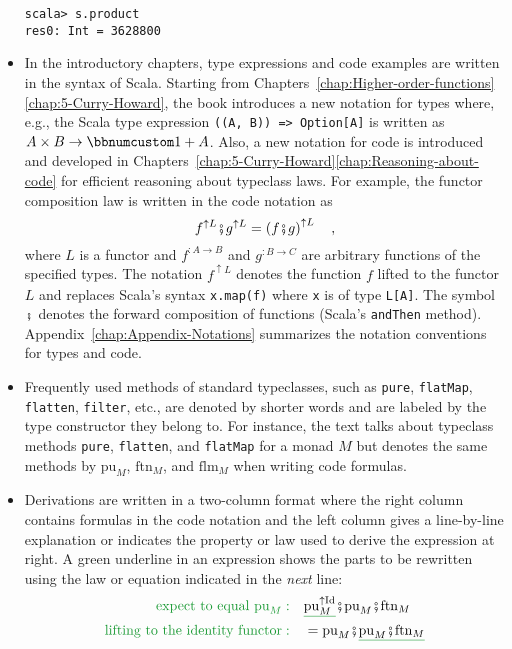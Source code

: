 \begin{itemize}
\begin{lstlisting}[mathescape=true]
scala> s.product
res0: Int = 3628800 
\end{lstlisting}
\item In the introductory chapters, type expressions and code examples are
written in the syntax of Scala. Starting from Chapters~\ref{chap:Higher-order-functions}\textendash \ref{chap:5-Curry-Howard},
the book introduces a new notation for types where, e.g., the Scala
type expression \lstinline!((A, B)) => Option[A]! is written as $A\times B\rightarrow\bbnum 1+A$.
Also, a new notation for code is introduced and developed in Chapters~\ref{chap:5-Curry-Howard}\textendash \ref{chap:Reasoning-about-code}
for efficient reasoning about typeclass laws. For example, the functor
composition law is written in the code notation as
\[
f^{\uparrow L}\bef g^{\uparrow L}=\left(f\bef g\right)^{\uparrow L}\quad,
\]
where $L$ is a functor and $f^{:A\rightarrow B}$ and $g^{:B\rightarrow C}$
are arbitrary functions of the specified types. The notation $f^{\uparrow L}$
denotes the function $f$ lifted to the functor $L$ and replaces
Scala\textsf{'}s syntax \lstinline!x.map(f)! where \lstinline!x! is of type
\lstinline!L[A]!. The symbol $\bef$ denotes the forward composition
of functions (Scala\textsf{'}s \lstinline!andThen! method). Appendix~\ref{chap:Appendix-Notations}
summarizes the notation conventions for types and code.
\item Frequently used methods of standard typeclasses, such as \lstinline!pure!,
\lstinline!flatMap!, \lstinline!flatten!, \lstinline!filter!, etc.,
are denoted by shorter words and are labeled by the type constructor
they belong to. For instance, the text talks about typeclass methods
\lstinline!pure!, \lstinline!flatten!, and \lstinline!flatMap!
for a monad $M$ but denotes the same methods by $\text{pu}_{M}$,
$\text{ftn}_{M}$, and $\text{flm}_{M}$ when writing code formulas.
\item Derivations are written in a two-column format where the right column
contains formulas in the code notation and the left column gives a
line-by-line explanation or indicates the property or law used to
derive the expression at right. A green underline in an expression
shows the parts to be rewritten using the law or equation indicated
in the \emph{next} line:
\begin{align*}
{\color{greenunder}\text{expect to equal }\text{pu}_{M}:}\quad & \gunderline{\text{pu}_{M}^{\uparrow\text{Id}}}\bef\text{pu}_{M}\bef\text{ftn}_{M}\\
{\color{greenunder}\text{lifting to the identity functor}:}\quad & =\text{pu}_{M}\bef\gunderline{\text{pu}_{M}\bef\text{ftn}_{M}}\\

\end{align*}
\end{itemize}
